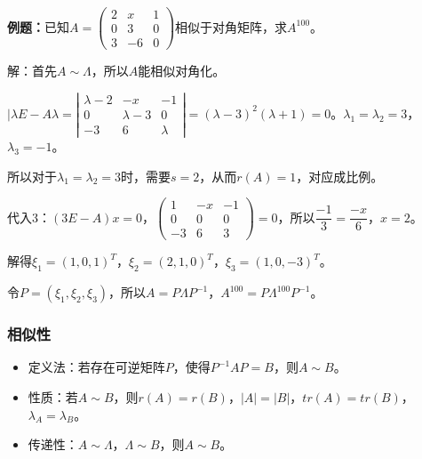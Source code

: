 \documentclass[UTF8, 12pt]{ctexart}
\begin{document}
\textbf{例题：}已知$A=\left(\begin{array}{ccc}
    2 & x & 1 \\
    0 & 3 & 0 \\
    3 & -6 & 0
\end{array}\right)$相似于对角矩阵，求$A^{100}$。\medskip

解：首先$A\sim\Lambda$，所以$A$能相似对角化。

$\vert\lambda E-A\lambda=\left|\begin{array}{ccc}
    \lambda-2 & -x & -1 \\
    0 & \lambda-3 & 0 \\
    -3 & 6 & \lambda
\end{array}\right|=(\lambda-3)^2(\lambda+1)=0$。$\lambda_1=\lambda_2=3$，$\lambda_3=-1$。

所以对于$\lambda_1=\lambda_2=3$时，需要$s=2$，从而$r(A)=1$，对应成比例。

代入3：$(3E-A)x=0$，$\left(\begin{array}{ccc}
    1 & -x & -1 \\
    0 & 0 & 0 \\
    -3 & 6 & 3
\end{array}\right)=0$，所以$\dfrac{-1}{3}=\dfrac{-x}{6}$，$x=2$。

解得$\xi_1=(1,0,1)^T$，$\xi_2=(2,1,0)^T$，$\xi_3=(1,0,-3)^T$。

令$P=(\xi_1,\xi_2,\xi_3)$，所以$A=P\Lambda P^{-1}$，$A^{100}=P\Lambda^{100}P^{-1}$。

\subsubsection{相似性}

\begin{itemize}
    \item 定义法：若存在可逆矩阵$P$，使得$P^{-1}AP=B$，则$A\sim B$。
    \item 性质：若$A\sim B$，则$r(A)=r(B)$，$\vert A\vert=\vert B\vert$，$tr(A)=tr(B)$，$\lambda_A=\lambda_B$。
    \item 传递性：$A\sim\Lambda$，$\Lambda\sim B$，则$A\sim B$。
\end{itemize}
\end{document}
